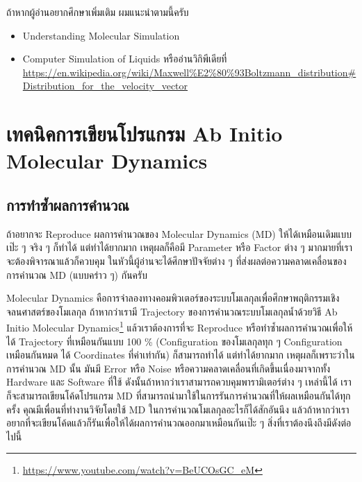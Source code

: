 ถ้าหากผู้อ่านอยากศึกษาเพิ่มเติม ผมแนะนำตามนี้ครับ

\begin{itemize}[topsep=0pt,noitemsep]
  \setlength\itemsep{1em}
  \item Understanding Molecular Simulation

  \item Computer Simulation of Liquids
        หรืออ่านวิกิพีเดียที่ \url{https://en.wikipedia.org/wiki/Maxwell%E2%80%93Boltzmann_distribution#Distribution_for_the_velocity_vector}
\end{itemize}

\section{เทคนิคการเขียนโปรแกรม Ab Initio Molecular Dynamics}

\subsection{การทำซ้ำผลการคำนวณ}

ถ้าอยากจะ Reproduce ผลการคำนวณของ Molecular Dynamics (MD) ให้ได้เหมือนเดิมแบบเป๊ะ ๆ จริง ๆ ก็ทำได้ แต่ทำได้ยากมาก เหตุผลก็คือมี
Parameter หรือ Factor ต่าง ๆ มากมายที่เราจะต้องพิจารณาแล้วก็ควบคุม ในหัวนี้ผู้อ่านจะได้ศึกษาปัจจัยต่าง ๆ ที่ส่งผลต่อความคลาดเคลื่อนของการคำนวณ
MD (แบบคร่าว ๆ) กันครับ

Molecular Dynamics คือการจำลองทางคอมพิวเตอร์ของระบบโมเลกุลเพื่อศึกษาพฤติกรรมเชิงจลนศาสตร์ของโมเลกุล ถ้าหากว่าเรามี Trajectory
ของการคำนวณระบบโมเลกุลน้ำด้วยวิธี Ab Initio Molecular Dynamics\footnote{\url{https://www.youtube.com/watch?v=BeUCOsGC_eM}}
แล้วเราต้องการที่จะ Reproduce หรือทำซ้ำผลการคำนวณเพื่อให้ได้ Trajectory ที่เหมือนกันแบบ 100 \% (Configuration ของโมเลกุลทุก ๆ
Configuration เหมือนกันหมด ได้ Coordinates ที่ค่าเท่ากัน) ก็สามารถทำได้ แต่ทำได้ยากมาก เหตุผลก็เพราะว่าในการคำนวณ MD นั้น มันมี
Error หรือ Noise หรือความคลาดเคลื่อนที่เกิดขึ้นเนื่องมาจากทั้ง Hardware และ Software ที่ใช้ ดังนั้นถ้าหากว่าเราสามารถควบคุมพารามิเตอร์ต่าง ๆ
เหล่านี้ได้ เราก็จะสามารถเขียนโค้ดโปรแกรม MD ที่สามารถนำมาใช้ในการรันการคำนวณที่ให้ผลเหมือนกันได้ทุกครั้ง คุณมีเพื่อนที่ทำงานวิจัยโดยใช้ MD
ในการคำนวณโมเลกุลอะไรก็ได้สักอันนึง แล้วถ้าหากว่าเราอยากที่จะเขียนโค้ดแล้วก็รันเพื่อให้ได้ผลการคำนวณออกมาเหมือนกันเป๊ะ ๆ สิ่งที่เราต้องนึงถึงมีดังต่อไปนี้

